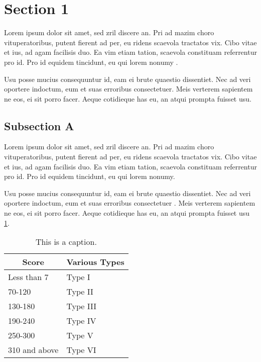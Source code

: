 \section{Section 1}
Lorem ipsum dolor sit amet, sed zril discere an. Pri ad mazim choro vituperatoribus, putent fierent ad per, eu ridens scaevola tractatos vix. Cibo vitae et ius, ad agam facilisis duo. Ea vim etiam tation, scaevola constituam referrentur pro id. Pro id equidem tincidunt, eu qui lorem nonumy \cite{pmid18583808,pmid18388390}.

Usu posse mucius consequuntur id, eam ei brute quaestio dissentiet. Nec ad veri oportere indoctum, eum et suas erroribus consectetuer. Meis verterem sapientem ne eos, ei sit porro facer. Aeque cotidieque has eu, an atqui prompta fuisset usu.


\subsection{Subsection A}

Lorem ipsum dolor sit amet, sed zril discere an. Pri ad mazim choro vituperatoribus, putent fierent ad per, eu ridens scaevola tractatos vix. Cibo vitae et ius, ad agam facilisis duo. Ea vim etiam tation, scaevola constituam referrentur pro id. Pro id equidem tincidunt, eu qui lorem nonumy.

Usu posse mucius consequuntur id, eam ei brute quaestio dissentiet. Nec ad veri oportere indoctum, eum et suas erroribus consectetuer \cite{pmid18713597}. Meis verterem sapientem ne eos, ei sit porro facer. Aeque cotidieque has eu, an atqui prompta fuisset usu \ref{tab:thesisfirsttable}.

\begin{table}[h]
	\centering
\begin{tabular}{|l|l|}
	\hline
	\multicolumn{1}{|c|}{{\bf Score}} & \multicolumn{1}{c|}{{\bf Various Types}} \\ \hline
	Less than 7                       & Type I                                           \\ \hline
	70-120                              & Type II                                          \\ \hline
	130-180                             & Type III                                         \\ \hline
	190-240                             & Type IV                                          \\ \hline
	250-300                             & Type V                                           \\ \hline
	310 and above                      & Type VI                                          \\ \hline
\end{tabular}
	\caption{This is a caption.}	
	\label{tab:thesisfirsttable}	
\end{table}

